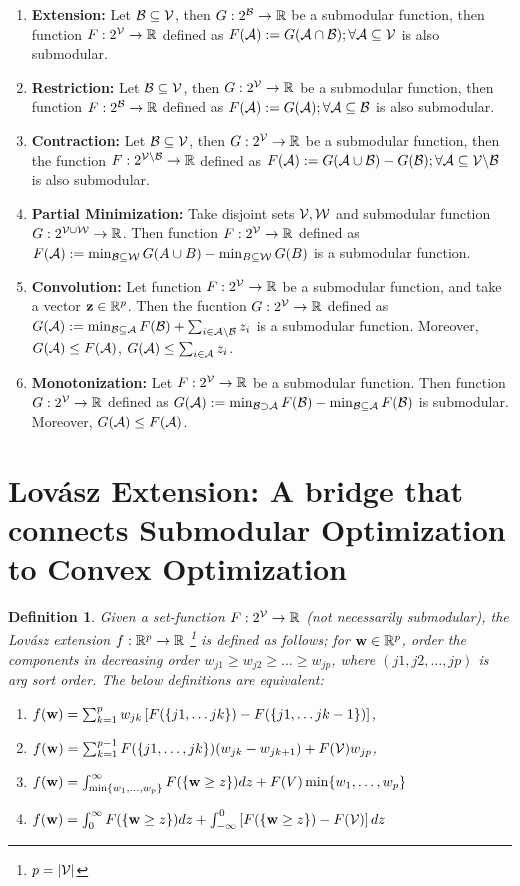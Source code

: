 \documentclass[11pt]{article}
\newtheorem{definition}{Definition}{\bf}{\it}
\def\W{\mathcal{W}}
\begin{document}
\begin{enumerate}
\item \textbf{Extension:} Let ${\cal B} \subseteq {\cal V}$, then $G: 2^{{\cal B}} \to {\mathbb R}$ be a submodular function, then
function $F: 2^{{\cal V}} \to {\mathbb R}$ defined as $F({\cal A}) := G({\cal A} \cap {\cal B}); \forall {\cal A} \subseteq {\cal V}$ is also submodular.
\item \textbf{Restriction:} Let ${\cal B} \subseteq {\cal V}$, then $G: 2^{{\cal V}} \to {\mathbb R}$ be a submodular function, then
function $F: 2^{{\cal B}} \to {\mathbb R}$ defined as $F({\cal A}) := G({\cal A}); \forall {\cal A} \subseteq {\cal B}$ is also submodular.
\item \textbf{Contraction:} Let ${\cal B} \subseteq {\cal V}$, then $G: 2^{{\cal V}} \to {\mathbb R}$ be a submodular function, then
the function $F: 2^{{\cal V} \backslash {\cal B}} \to {\mathbb R}$ defined as $F({\cal A}) := G({\cal A} \cup {\cal B}) - G({\cal B}); \forall {\cal A} \subseteq {\cal V} \backslash {\cal B}$ 
is also submodular.
\item \textbf{Partial Minimization:} Take disjoint sets $\V, \W$ and submodular function $G: 2^{\V \cup \W} \to \R$.
Then function $F: 2^{{\cal V}} \to {\mathbb R}$ defined as
$F(\A) := \min_{\B \subseteq \W}G(A \cup B) - \min_{B \subseteq \W}G(B)$ is a submodular function.
\item \textbf{Convolution:} 
Let function $F: 2^{{\cal V}} \to {\mathbb R}$ be a submodular function, and take a vector ${\bf z} \in {\mathbb R}^{p}$.
Then the fucntion $G: 2^{{\cal V}} \to {\mathbb R}$ defined as $G({\cal A}) := \min_{{\cal B} \subseteq {\cal A}}F({\cal B}) + \sum_{i \in {\cal A} \backslash {\cal B}}z_i$
is a submodular function. Moreover, $G({\cal A}) \leq F({\cal A})$, $G({\cal A}) \leq \sum_{i \in {\cal A}}z_i$.
\item \textbf{Monotonization:} Let $F: 2^{{\cal V}} \to {\mathbb R}$ be a submodular function.
Then function $G: 2^{{\cal V}} \to {\mathbb R}$ defined as $G({\cal A}) := \min_{{\cal B} \supset {\cal A}} F({\cal B}) - \min_{{\cal B} \subseteq {\cal A}}F({\cal B})$
is submodular. Moreover, $G({\cal A}) \leq F({\cal A})$.
\end{enumerate}

\section{Lovász Extension: A bridge that connects Submodular Optimization to Convex Optimization}

\begin{definition}Given
a set-function $F: 2^{{\cal V}} \to {\mathbb R}$ (not necessarily submodular), the Lovász extension $f: {\mathbb R}^{p} \to {\mathbb R}$ \footnote{$p = |{\cal V}|$}
is defined as follows; for ${\bf w} \in {\mathbb R}^{p}$, order the components
in decreasing order $w_{j1} \geq w_{j2} \geq \dots \geq w_{jp}$, where $(j1, j2, \dots, jp)$ is arg sort order.
The below definitions are equivalent:
\begin{enumerate}
  \item $f({\bf w}) = \sum_{k=1}^{p}w_{jk}\left[F(\{j1, \dots j{k}\}) - F(\{j1, \dots j{k-1}\})\right]$,
  \item $f({\bf w}) = \sum_{k=1}^{p-1}F(\{j1, \dots, jk\})(w_{jk} - w_{j{k+1}}) + F({\cal V})w_{jp}$,
  \item $f({\bf w}) = \int_{\min\{w_1, \dots, w_p\}}^{\infty}F(\{{\bf w} \geq z\})dz + F(V)\min\{w_1, \dots, w_p\}$
  \item $f({\bf w}) = \int_{0}^{\infty}F(\{{\bf w} \geq z\})dz + \int_{-\infty}^{0}\left[F(\{{\bf w} \geq z\}) - F({\cal V})\right]dz$ 
\end{enumerate}
\end{definition}
\end{document}
